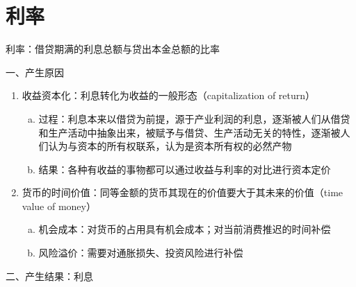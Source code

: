 \documentclass[12pt]{book}
\begin{document}
\chapter{利率}


利率：借贷期满的利息总额与贷出本金总额的比率

一、产生原因

\begin{enumerate}[(1)]
    \item 收益资本化：利息转化为收益的一般形态（capitalization of return）
          \begin{enumerate}[a.]
              \item 过程：利息本来以借贷为前提，源于产业利润的利息，逐渐被人们从借贷和生产活动中抽象出来，被赋予与借贷、生产活动无关的特性，逐渐被人们认为与资本的所有权联系，认为是资本所有权的必然产物
              \item 结果：各种有收益的事物都可以通过收益与利率的对比进行资本定价
          \end{enumerate}
    \item 货币的时间价值：同等金额的货币其现在的价值要大于其未来的价值（time value of money）
          \begin{enumerate}[a.]
              \item 机会成本：对货币的占用具有机会成本；对当前消费推迟的时间补偿
              \item 风险溢价：需要对通胀损失、投资风险进行补偿
          \end{enumerate}
\end{enumerate}


二、产生结果：利息
\end{document}
